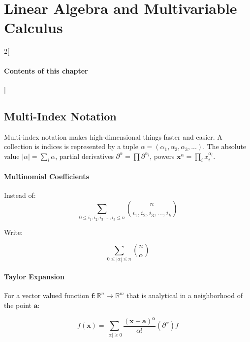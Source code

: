 \chapter{Linear Algebra and Multivariable Calculus}

\begin{multicols}{2}[\subsubsection*{Contents of this chapter}]
\end{multicols}



\section{Multi-Index Notation}
Multi-index notation makes high-dimensional things faster and easier. A collection is indices is represented by a tuple $\alpha = \left(\alpha_1,\alpha_2,\alpha_3,... \right)$. The absolute value $|\alpha| = \sum_i \alpha$, partial derivatives $\partial^\alpha = \prod \partial^{\alpha_i}$, powers $\mathbf{x}^\alpha = \prod_i x_i^{\alpha_i}$.

\subsubsection{Multinomial Coefficients}

Instead of:
\begin{equation}
\sum_{0\leq i_1,i_2,i_3,...,i_k \leq n} {n \choose i_1,i_2,i_3,...,i_k} 
\end{equation}

Write:

\begin{equation}
\sum_{0\leq |\alpha|\leq n}{n \choose \alpha}
\end{equation}

\subsubsection{Taylor Expansion}

For a vector valued function $\mathbf{f}: \mathbb{R}^n \rightarrow \mathbb{R}^m$ that is analytical in a neighborhood of the point $\mathbf{a}$:

\begin{equation}
f(\mathbf{x}) = \sum_{|\alpha|\geq0} \frac{(\mathbf{x} - \mathbf{a})^\alpha}{\alpha!}(\partial^\alpha)f
\end{equation}


